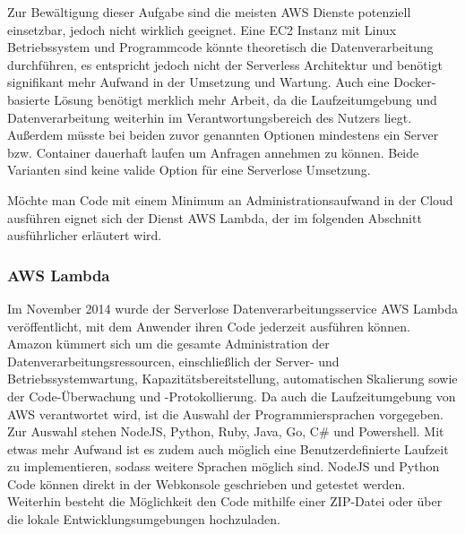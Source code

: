 {Zur Bewältigung dieser Aufgabe sind die meisten AWS Dienste potenziell einsetzbar, jedoch nicht wirklich geeignet.
Eine EC2 Instanz mit Linux Betriebssystem und Programmcode könnte theoretisch die Datenverarbeitung durchführen, es entspricht jedoch nicht der Serverless Architektur und benötigt signifikant mehr Aufwand in der Umsetzung und Wartung.
Auch eine Docker-basierte Lösung benötigt merklich mehr Arbeit, da die Laufzeitumgebung und Datenverarbeitung weiterhin im Verantwortungsbereich des Nutzers liegt.
Außerdem müsste bei beiden zuvor genannten Optionen mindestens ein Server bzw. Container dauerhaft laufen um Anfragen annehmen zu können.
Beide Varianten sind keine valide Option für eine Serverlose Umsetzung.

Möchte man Code mit einem Minimum an Administrationsaufwand in der Cloud ausführen eignet sich der Dienst AWS Lambda, der im folgenden Abschnitt ausführlicher erläutert wird.

\subsubsection{AWS Lambda}
\label{Lambda}
Im November 2014 wurde der Serverlose Datenverarbeitungsservice AWS Lambda veröffentlicht, mit dem Anwender ihren Code jederzeit ausführen können.
Amazon kümmert sich um die \glqq gesamte Administration der Datenverarbeitungsressourcen, einschließlich der Server- und Betriebssystemwartung, Kapazitätsbereitstellung, automatischen Skalierung sowie der Code-Überwachung und -Protokollierung.\grqq{} \cite{LambdaZitat}
\clearpage
Da auch die Laufzeitumgebung von AWS verantwortet wird, ist die Auswahl der Programmiersprachen vorgegeben.
Zur Auswahl stehen NodeJS, Python, Ruby, Java, Go, C\# und Powershell.
Mit etwas mehr Aufwand ist es zudem auch möglich eine Benutzerdefinierte Laufzeit zu implementieren, sodass weitere Sprachen möglich sind.
NodeJS und Python Code können direkt in der Webkonsole geschrieben und getestet werden.
Weiterhin besteht die Möglichkeit den Code mithilfe einer ZIP-Datei oder über die lokale Entwicklungsumgebungen hochzuladen.\cite{LambdaFAQ}

}
